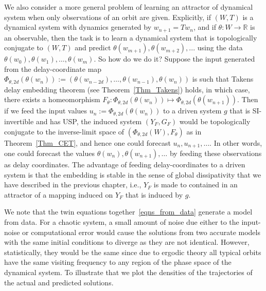We also consider a more general problem of learning an attractor of dynamical system when only observations of an orbit are given. Explicitly, if $(W,T)$ is a dynamical system with dynamics generated by $w_{n+1}=Tw_n$, and if $\theta:W \to \mathbb{R}$ is an observable, then the task is to learn a dynamical system that is topologically conjugate to $(W,T)$ and predict $\theta(w_{m+1}),\theta(w_{m+2}),...$ using the data $\theta(w_{0}),\theta(w_{1}),\ldots,\theta(w_{m})$.  So how do we do it?
Suppose the input generated from the delay-coordinate map $\Phi_{\theta,2d}(\theta(w_{n})) := (\theta(w_{n-2d}),\ldots,\theta(w_{n-1}),\theta(w_{n}))$ is such that Takens delay embedding theorem (see Theorem~\ref{Thm_Takens}) holds, in which case, there exists a homeomorphism  $F_\theta: \Phi_{\theta,2d}(\theta(w_{n})) \mapsto \Phi_{\theta,2d}(\theta(w_{n+1}))$. Then if we feed  the input values $u_n := \Phi_{\theta,2d}(\theta(w_{n}))$ to a driven system $g$ that is SI-invertible and has USP, the induced system $(Y_F,G_F)$ would be topologically conjugate to the inverse-limit space of
$(\Phi_{\theta,2d}(W), F_\theta)$ as in Theorem~\ref{Thm_CET}, and hence one could forecast $u_n,u_{n+1},\ldots$. In other words, one could forecast  the values $\theta(w_n), \theta(w_{n+1}),\ldots$ by feeding these observations as delay coordinates. The advantage of feeding delay-coordinates to a driven system is that the embedding is stable in the sense of global dissipativity that we have described in the previous chapter, i.e., $Y_F$ is made to contained in an attractor of a mapping induced on $Y_F$ that is induced by $g$. 

We note that the twin equations together~\ref{eqns_from_data} generate a model from data. For a chaotic system, a small amount of noise due either to the input-noise or computational error would cause the solutions from two accurate models with the same initial conditions to  diverge as they are not identical.  However, statistically, they would be the same since due to ergodic theory all typical orbits have the same visiting frequency to any region of the phase space of the dynamical system.  To illustrate that we plot the densities of the trajectories of the actual and predicted solutions. 

